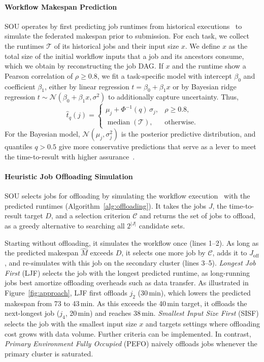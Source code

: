 

\paragraph{Workflow Makespan Prediction}
SOU operates by first predicting job runtimes from historical executions~\cite{bader_lotaru_2024, bader_sizey_2024, balis_evaluation_2023} to simulate the federated makespan prior to submission.
For each task, we collect the runtimes $\mathcal T$ of its historical jobs and their input size $x$. We define $x$ as the total size of the initial workflow inputs that a job and its ancestors consume, which we obtain by reconstructing the job DAG.
If $x$ and the runtime show a Pearson correlation of $\rho\geq0.8$, we fit a task-specific model with intercept $\beta_0$ and coefficient $\beta_1$, either by linear regression $t=\beta_0+\beta_1x$ or by Bayesian ridge regression $t\sim\mathcal N(\beta_0+\beta_1x,\sigma^2)$ to additionally capture uncertainty. Thus,
\[
\hat t_q(j)=
\begin{cases}
\mu_j+\Phi^{-1}(q)\,\sigma_j, & \rho\geq0.8,\\
\operatorname{median}(\mathcal T), & \text{otherwise}.
\end{cases}
\]
For the Bayesian model, $\mathcal N(\mu_j,\sigma_j^2)$ is the posterior predictive distribution, and quantiles $q>0.5$ give more conservative predictions that serve as a lever to meet the time-to-result with higher assurance~\cite{park_3sigma_2018}.

\paragraph{Heuristic Job Offloading Simulation}

SOU selects jobs for offloading by simulating the workflow execution~\cite{casanova_wrench_2020} with the predicted runtimes (Algorithm~\ref{alg:offloading}). It takes the jobs $J$, the time-to-result target $D$, and a selection criterion $\mathcal{C}$ and returns the set of jobs to offload, as a greedy alternative to searching all $2^{|J|}$ candidate sets.

Starting without offloading, it simulates the workflow once (lines 1--2). As long as the predicted makespan $\hat M$ exceeds $D$, it selects one more job by $\mathcal{C}$, adds it to $J_\mathrm{off}$, and re-simulates with this job on the secondary cluster (lines 3--5).
\emph{Longest Job First} (LJF) selects the job with the longest predicted runtime, as long-running jobs best amortize offloading overheads such as data transfer.
As illustrated in Figure~\ref{fig:approach}, LJF first offloads $j_2$ (30\,min), which lowers the predicted makespan from 73 to 43\,min. As this exceeds the 40\,min target, it offloads the next-longest job ($j_4$, 20\,min) and reaches 38\,min. \emph{Smallest Input Size First} (SISF) selects the job with the smallest input size $x$ and targets settings where offloading cost grows with data volume. Further criteria can be implemented.
In contrast, \emph{Primary Environment Fully Occupied} (PEFO) naively offloads jobs whenever the primary cluster is saturated.

